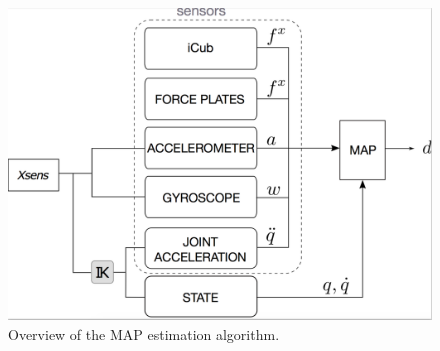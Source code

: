 %
\begin{figure}
  \centering
    \includegraphics[width=1\columnwidth]{figs/schemeAlgorithm}
  \caption{Overview of the MAP estimation algorithm.} 
  \label{fig:figs_schemeAlgorithm}
\end{figure}